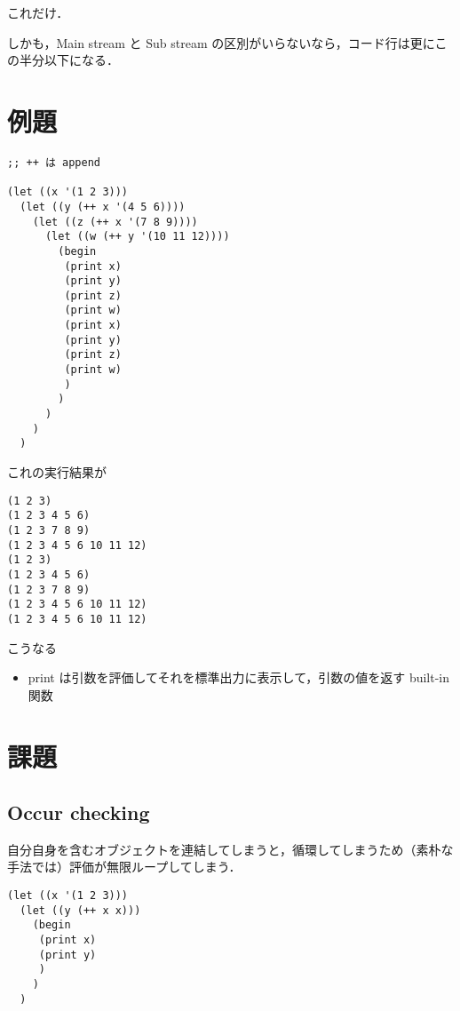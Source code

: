 \documentclass[10pt, a4j, twocolumn]{scrartcl}
\begin{document}
これだけ．

しかも，Main stream と Sub stream の区別がいらないなら，コード行は更にこの半分以下になる．


\section{例題}
\label{sec:org4380289}

\begin{lstlisting}
;; ++ は append

(let ((x '(1 2 3)))
  (let ((y (++ x '(4 5 6))))
    (let ((z (++ x '(7 8 9))))
      (let ((w (++ y '(10 11 12))))
        (begin
         (print x)
         (print y)
         (print z)
         (print w)
         (print x)
         (print y)
         (print z)
         (print w)
         )
        )
      )
    )
  )
\end{lstlisting}


これの実行結果が

\begin{verbatim}
(1 2 3)
(1 2 3 4 5 6)
(1 2 3 7 8 9)
(1 2 3 4 5 6 10 11 12)
(1 2 3)
(1 2 3 4 5 6)
(1 2 3 7 8 9)
(1 2 3 4 5 6 10 11 12)
(1 2 3 4 5 6 10 11 12)
\end{verbatim}

こうなる
\begin{itemize}
\item print は引数を評価してそれを標準出力に表示して，引数の値を返す built-in 関数
\end{itemize}


\section{課題}
\label{sec:org8d4f06d}

\subsection{Occur checking}
\label{sec:org8b2cb51}

自分自身を含むオブジェクトを連結してしまうと，循環してしまうため（素朴な手法では）評価が無限ループしてしまう．

\begin{lstlisting}
(let ((x '(1 2 3)))
  (let ((y (++ x x)))
    (begin
     (print x)
     (print y)
     )
    )
  )
\end{lstlisting}
\end{document}
